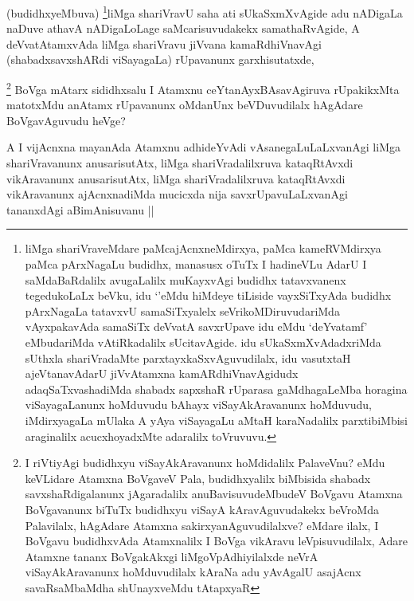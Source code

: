 \begin{artha}
(budidhxyeMbuva) \footnote{liMga shariVraveMdare paMcajAcnxneMdirxya, paMca kameRVMdirxya paMca pArxNagaLu budidhx, manasusx oTuTx I hadineVLu AdarU I saMdaBaRdalilx avugaLalilx muKayxvAgi budidhx tatavxvanenx tegedukoLaLx beVku, idu `\stext'eMdu hiMdeye tiLiside vayxSiTxyAda budidhx pArxNagaLa tatavxvU samaSiTxyalelx seVrikoMDiruvudariMda vAyxpakavAda samaSiTx deVvatA savxrUpave idu eMdu `deYvatamf' eMbudariMda vAtiRkadalilx sUcitavAgide. idu sUkaSxmXvAdadxriMda sUthxla shariVradaMte parxtayxkaSxvAguvudilalx, idu vasutxtaH ajeVtanavAdarU jiVvAtamxna kamARdhiVnavAgidudx adaqSaTxvashadiMda shabadx sapxshaR rUparasa gaMdhagaLeMba horagina viSayagaLanunx hoMduvudu bAhayx viSayAkAravanunx hoMduvudu, iMdirxyagaLa mUlaka A yAya viSayagaLu aMtaH karaNadalilx parxtibiMbisi araginalilx acucxhoyadxMte adaralilx toVruvuvu.}liMga shariVravU saha ati sUkaSxmXvAgide adu nADigaLa naDuve athavA nADigaLoLage saMcarisuvudakekx samathaRvAgide, A deVvatAtamxvAda liMga shariVravu jiVvana kamaRdhiVnavAgi (shabadxsavxshARdi viSayagaLa) rUpavanunx garxhisutatxde, 
\end{artha}

\begin{artha}
\footnote{I riVtiyAgi budidhxyu viSayAkAravanunx hoMdidalilx PalaveVnu? eMdu keVLidare Atamxna BoVgaveV Pala, budidhxyalilx biMbisida shabadx savxshaRdigalanunx jAgaradalilx anuBavisuvudeMbudeV BoVgavu Atamxna BoVgavanunx biTuTx budidhxyu viSayA kAravAguvudakekx beVroMda Palavilalx, hAgAdare Atamxna sakirxyanAguvudilalxve? eMdare ilalx, I BoVgavu budidhxvAda Atamxnalilx I BoVga vikAravu leVpisuvudilalx, Adare Atamxne tananx BoVgakAkxgi liMgoVpAdhiyilalxde neVrA viSayAkAravanunx hoMduvudilalx kAraNa adu yAvAgalU asajAcnx savaRsaMbaMdha shUnayxveMdu tAtapxyaR}
BoVga mAtarx sididhxsalu I Atamxnu ceYtanAyxBAsavAgiruva rUpakikxMta matotxMdu anAtamx rUpavanunx oMdanUnx beVDuvudilalx hAgAdare BoVgavAguvudu heVge?
\end{artha}

\begin{artha}
A I vijAcnxna mayanAda Atamxnu adhideYvAdi vAsanegaLuLaLxvanAgi liMga shariVravanunx anusarisutAtx, liMga shariVradalilxruva kataqRtAvxdi vikAravanunx anusarisutAtx, liMga shariVradalilxruva kataqRtAvxdi vikAravanunx ajAcnxnadiMda mucicxda nija savxrUpavuLaLxvanAgi tananxdAgi aBimAnisuvanu ||
\end{artha}



